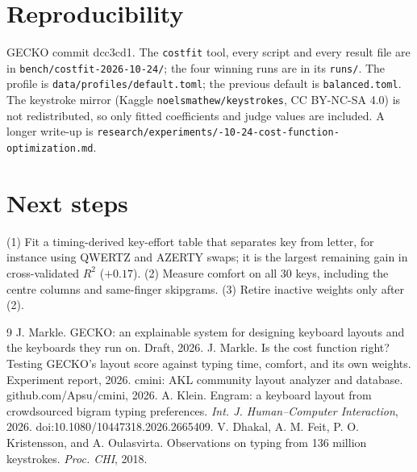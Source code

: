 \documentclass{gecko-paper}
\begin{document}
\begin{paperbody}
\section{Reproducibility}\sloppy
GECKO commit dcc3cd1. The \texttt{costfit} tool, every script and every result file are in \texttt{bench/costfit-2026-10-24/}; the four winning runs are in its \texttt{runs/}. The profile is \texttt{data/profiles/default.toml}; the previous default is \texttt{balanced.toml}. The keystroke mirror (Kaggle \texttt{noelsmathew/\allowbreak keystrokes}, CC BY-NC-SA 4.0) is not redistributed, so only fitted coefficients and judge values are included. A longer write-up is \texttt{research/\allowbreak experiments/-10-24-cost-\allowbreak function-\allowbreak optimization.md}.

\section{Next steps}
(1) Fit a timing-derived key-effort table that separates key from letter, for instance using QWERTZ and AZERTY swaps; it is the largest remaining gain in cross-validated $R^2$ ($+0.17$). (2) Measure comfort on all 30 keys, including the centre columns and same-finger skipgrams. (3) Retire inactive weights only after (2).

\renewcommand{\refname}{References}
\begin{thebibliography}{9}
\paperbibstyle
{} J. Markle. GECKO: an explainable system for designing keyboard layouts and the keyboards they run on. Draft, 2026.
 J. Markle. Is the cost function right? Testing GECKO's layout score against typing time, comfort, and its own weights. Experiment report, 2026.
 cmini: AKL community layout analyzer and database. github.com/Apsu/cmini, 2026.
 A. Klein. Engram: a keyboard layout from crowdsourced bigram typing preferences. \textit{Int. J. Human–Computer Interaction}, 2026. doi:10.1080/10447318.2026.2665409.
 V. Dhakal, A. M. Feit, P. O. Kristensson, and A. Oulasvirta. Observations on typing from 136 million keystrokes. \textit{Proc. CHI}, 2018.
\end{thebibliography}
\end{paperbody}
\end{document}
